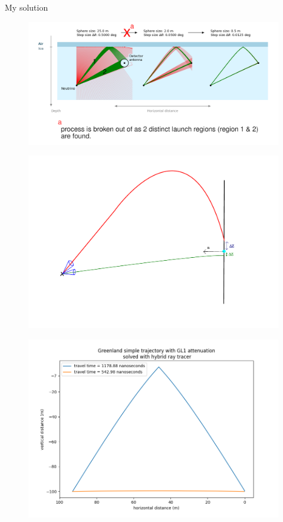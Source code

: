 \documentclass{beamer}
\begin{document}
\begin{frame}
	\centering
	My solution
\end{frame}
\begin{frame}
	\begin{figure}
		\includegraphics[width=\textwidth]{figures/explanation.png}
	\end{figure}
\end{frame}
\begin{frame}
	\begin{figure}
		\includegraphics[width=\textwidth]{figures/PrincipleHybridIllu.pdf}
	\end{figure}
\end{frame}
\begin{frame}
	\begin{figure}
		\includegraphics[width=\textwidth]{figures/hybrid.png}
	\end{figure}
\end{frame}
\end{document}
